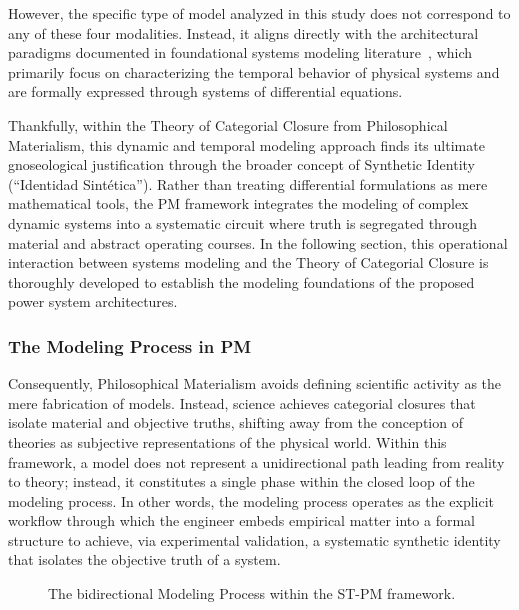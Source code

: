\documentclass[11pt, a4paper]{article}
\begin{document}
However, the specific type of model analyzed in this study does not correspond to any of these four modalities. Instead, it aligns directly with the architectural paradigms documented in foundational systems modeling literature~\cite{Wellstead79}, which primarily focus on characterizing the temporal behavior of physical systems and are formally expressed through systems of differential equations.

Thankfully, within the Theory of Categorial Closure from Philosophical Materialism, this dynamic and temporal modeling approach finds its ultimate gnoseological justification through the broader concept of Synthetic Identity (``Identidad Sintética''). Rather than treating differential formulations as mere mathematical tools, the PM framework integrates the modeling of complex dynamic systems into a systematic circuit where truth is segregated through material and abstract operating courses. In the following section, this operational interaction between systems modeling and the Theory of Categorial Closure is thoroughly developed to establish the modeling foundations of the proposed power system architectures.


\subsubsection*{The Modeling Process in PM} \label{sec:modeling_process_pm}

Consequently, Philosophical Materialism avoids defining scientific activity as the mere fabrication of models. Instead, science achieves categorial closures that isolate material and objective truths, shifting away from the conception of theories as subjective representations of the physical world. Within this framework, a model does not represent a unidirectional path leading from reality to theory; instead, it constitutes a single phase within the closed loop of the modeling process. In other words, the modeling process operates as the explicit workflow through which the engineer embeds empirical matter into a formal structure to achieve, via experimental validation, a systematic synthetic identity that isolates the objective truth of a system.

\begin{figure}[h]
\begin{center}
\end{center}\vspace{-3ex} \caption{The bidirectional Modeling Process within the ST-PM framework.} \label{fig:modeling}
\end{figure}
\end{document}
